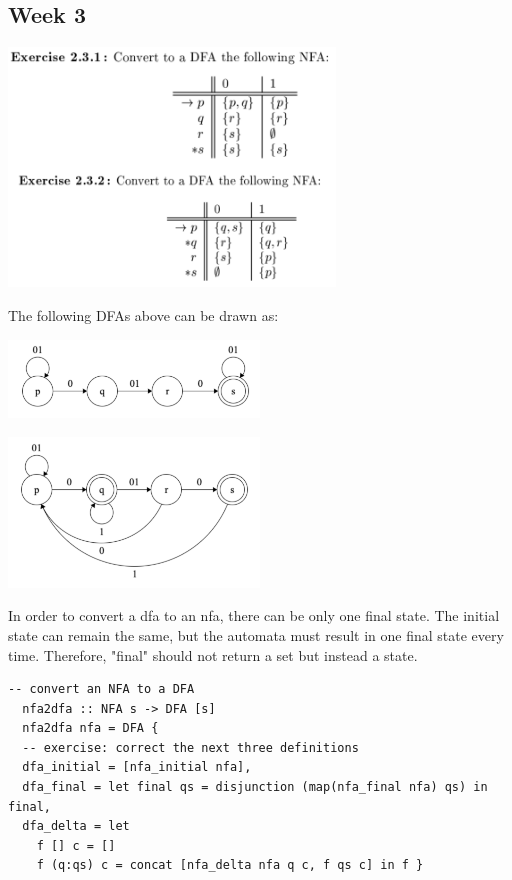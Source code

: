 \documentclass{article}
\theoremstyle{theorem}
\theoremstyle{definition}
\theoremstyle{remark}
\begin{document}
\subsection{Week 3}

\includegraphics[width=0.65\textwidth]{Images/2.3.1and2.3.2_chart.png}

\noindent
The following DFAs above can be drawn as:

\includegraphics[width=0.50\textwidth]{Images/2.3.1.png}

\includegraphics[width=0.50\textwidth]{Images/2.3.2.png}

\medskip\noindent
In order to convert a dfa to an nfa, there can be only one final state. The initial state can remain the same, but the automata must result in one final state every time. Therefore, "final" should not return a set but instead a state.

\begin{lstlisting}[style=HaskellStyle]
  -- convert an NFA to a DFA
  nfa2dfa :: NFA s -> DFA [s]
  nfa2dfa nfa = DFA {
  -- exercise: correct the next three definitions 
  dfa_initial = [nfa_initial nfa],
  dfa_final = let final qs = disjunction (map(nfa_final nfa) qs) in final,
  dfa_delta = let
    f [] c = []
    f (q:qs) c = concat [nfa_delta nfa q c, f qs c] in f }
\end{lstlisting}
\end{document}
